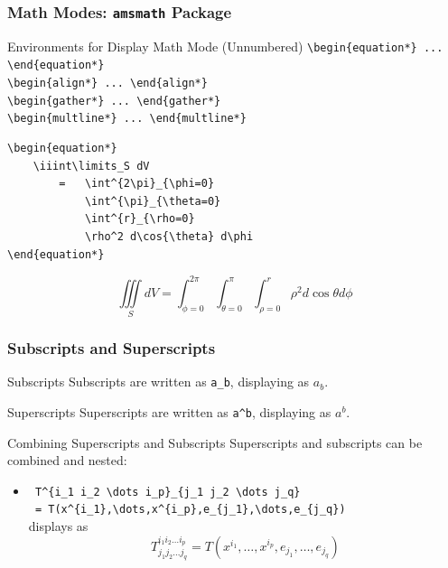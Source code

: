 \begin{frame}[fragile]
\frametitle{Math Modes: \texttt{amsmath} Package} 
\begin{block}{Environments for Display Math Mode (Unnumbered)}
\small
\verb|\begin{equation*} ... \end{equation*}| \\
\verb|\begin{align*} ... \end{align*}| \\
\verb|\begin{gather*} ... \end{gather*}| \\
\verb|\begin{multline*} ... \end{multline*}| \\
\end{block}
\begin{exampleblock}{}
\small
\begin{verbatim}
\begin{equation*}
    \iiint\limits_S dV 
        =   \int^{2\pi}_{\phi=0} 
            \int^{\pi}_{\theta=0}
            \int^{r}_{\rho=0} 
            \rho^2 d\cos{\theta} d\phi
\end{equation*}
\end{verbatim}
    \begin{equation*}
        \iiint\limits_S dV 
        =   \int^{2\pi}_{\phi=0} 
            \int^{\pi}_{\theta=0} 
            \int^{r}_{\rho=0} 
            \rho^2 d\cos{\theta} d\phi
    \end{equation*}
\end{exampleblock}
\end{frame}




\begin{frame}[fragile]
\frametitle{Subscripts and Superscripts}
\begin{block}{Subscripts}
    Subscripts are written as \verb|a_b|, displaying as $a_b$. 
\end{block}
\begin{block}{Superscripts}
    Superscripts are written as \verb|a^b|, displaying as $a^b$.
\end{block}
\begin{block}{Combining Superscripts and Subscripts}
    Superscripts and subscripts can be combined and nested:
    \begin{itemize}
    \item \small \verb| T^{i_1 i_2 \dots i_p}_{j_1 j_2 \dots j_q} | \\
    \verb| = T(x^{i_1},\dots,x^{i_p},e_{j_1},\dots,e_{j_q}) | 
    \\ displays as \[ T^{i_1 i_2 \dots i_p}_{j_1 j_2 \dots j_q} = T(x^{i_1},\dots,x^{i_p},e_{j_1},\dots,e_{j_q}) \] 
    \end{itemize}
\end{block}
\end{frame}


